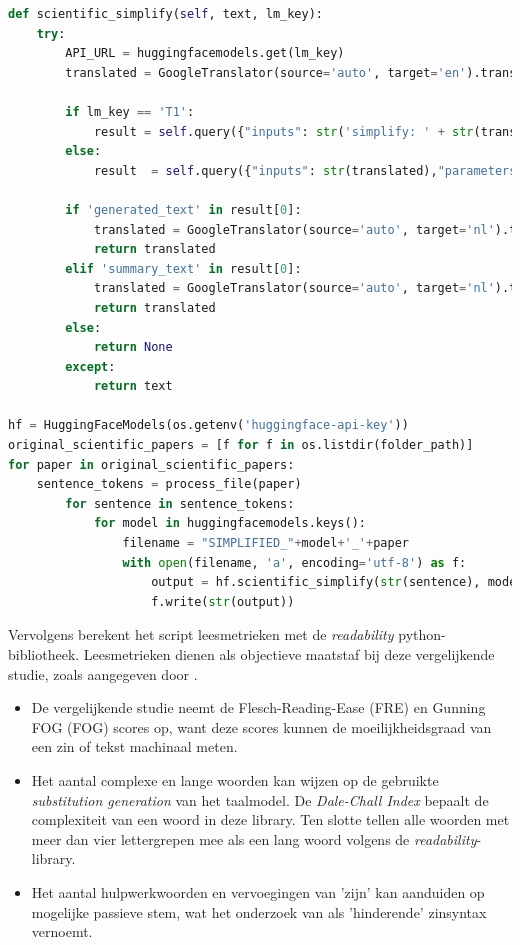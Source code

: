 \begin{center}
	\begin{lstlisting}[language=Python, caption={Script voor de derde fase van de vergelijkende studie}, label={code:verg-studie-phase-3}]
 def scientific_simplify(self, text, lm_key):
    try:
        API_URL = huggingfacemodels.get(lm_key)
        translated = GoogleTranslator(source='auto', target='en').translate(str(text))
    
        if lm_key == 'T1':
            result = self.query({"inputs": str('simplify: ' + str(translated)),"parameters": {"max_length": len(sentence)+10},"options":{"wait_for_model":True}}, API_URL)
        else:
            result  = self.query({"inputs": str(translated),"parameters": {"max_length": len(sentence)+10},"options":{"wait_for_model":True}}, API_URL)
    
        if 'generated_text' in result[0]:
            translated = GoogleTranslator(source='auto', target='nl').translate(str(result[0]['generated_text']))
            return translated
        elif 'summary_text' in result[0]:
            translated = GoogleTranslator(source='auto', target='nl').translate(str(result[0]['summary_text']))
            return translated
        else:
            return None
        except:
            return text		
            
hf = HuggingFaceModels(os.getenv('huggingface-api-key'))
original_scientific_papers = [f for f in os.listdir(folder_path)]
for paper in original_scientific_papers:
    sentence_tokens = process_file(paper) 
        for sentence in sentence_tokens:
            for model in huggingfacemodels.keys():
                filename = "SIMPLIFIED_"+model+'_'+paper
                with open(filename, 'a', encoding='utf-8') as f:
                    output = hf.scientific_simplify(str(sentence), model)
                    f.write(str(output)) 
	\end{lstlisting}
\end{center}

Vervolgens berekent het script leesmetrieken met de \textit{readability} python-bibliotheek. Leesmetrieken dienen als objectieve maatstaf bij deze vergelijkende studie, zoals aangegeven door \textcite{Nenkova2004}. 

\begin{itemize}
	\item De vergelijkende studie neemt de Flesch-Reading-Ease (FRE) en Gunning FOG (FOG) scores op, want deze scores kunnen de moeilijkheidsgraad van een zin of tekst machinaal meten.
	\item Het aantal complexe en lange woorden kan wijzen op de gebruikte \textit{substitution generation} van het taalmodel. De \textit{Dale-Chall Index} bepaalt de complexiteit van een woord in deze library. Ten slotte tellen alle woorden met meer dan vier lettergrepen mee als een lang woord volgens de \textit{readability}-library.
	\item Het aantal hulpwerkwoorden en vervoegingen van 'zijn' kan aanduiden op mogelijke passieve stem, wat het onderzoek van \textcite{Ruelas2020} als 'hinderende' zinsyntax vernoemt.
\end{itemize}

